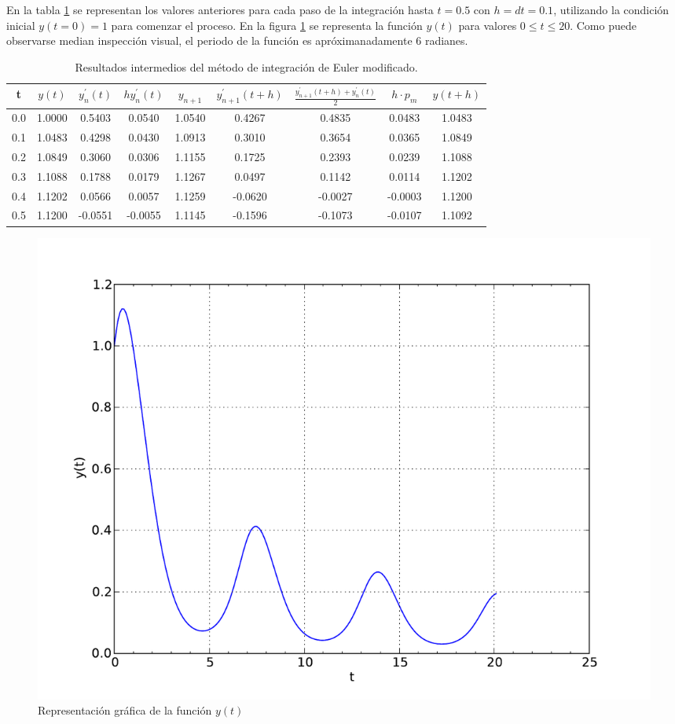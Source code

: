 \documentclass[a4paper, 12pt]{article}
\begin{document}
En la tabla \ref{tab:resultados} se representan los valores anteriores para cada
paso de la integración hasta $t=0.5$ con $h=dt=0.1$, utilizando la condición
inicial $y(t = 0) = 1$ para comenzar el proceso. En la figura \ref{fig:grafica}
se representa la función $y(t)$ para valores $ 0 \leq t \leq 20$.
Como puede observarse median inspección visual, el periodo de la función es
apróximanadamente 6 radianes.

\begin{table}
\begin{center}
\begin{tabular}{|c|c|c|c|c|c|c|c|c|}
\hline
 t & $y(t)$ & $y^{'}_n(t)$ & $hy^{'}_n(t)$ & $y_{n+1}$ & $y^{'}_{n+1}(t+h)$ & $\frac{y^{'}_{n+1}(t+h) + y^{'}_{n}(t)}{2}$
 & $h \cdot p_{m}$ & $y(t+h)$\\
 \hline\hline
0.0  &  1.0000  &  0.5403  &  0.0540  & 1.0540  &  0.4267   & 0.4835   &  0.0483  &  1.0483\\ \hline
0.1  &  1.0483  &  0.4298  &  0.0430  &  1.0913 &   0.3010  &  0.3654  &   0.0365 &   1.0849\\ \hline
0.2  &  1.0849  &  0.3060  &  0.0306  &  1.1155 &   0.1725  &  0.2393  &   0.0239 &   1.1088\\ \hline
0.3  &  1.1088  &  0.1788  &  0.0179  &  1.1267 &   0.0497  &  0.1142  &  0.0114  &  1.1202\\ \hline
0.4  &  1.1202  &  0.0566  &  0.0057  &  1.1259 &   -0.0620 &  -0.0027 &  -0.0003 &  1.1200\\ \hline
0.5  &  1.1200  &  -0.0551 &  -0.0055 &  1.1145 &   -0.1596 &  -0.1073 &  -0.0107 &  1.1092\\ \hline

\end{tabular}
\end{center}
\caption{Resultados intermedios del método de integración de Euler modificado.}
\label{tab:resultados}
\end{table}

\begin{figure}
\includegraphics[width=\linewidth]{grafica}
\caption{Representación gráfica de la función $y(t)$}
\label{fig:grafica}
\end{figure}
\end{document}
